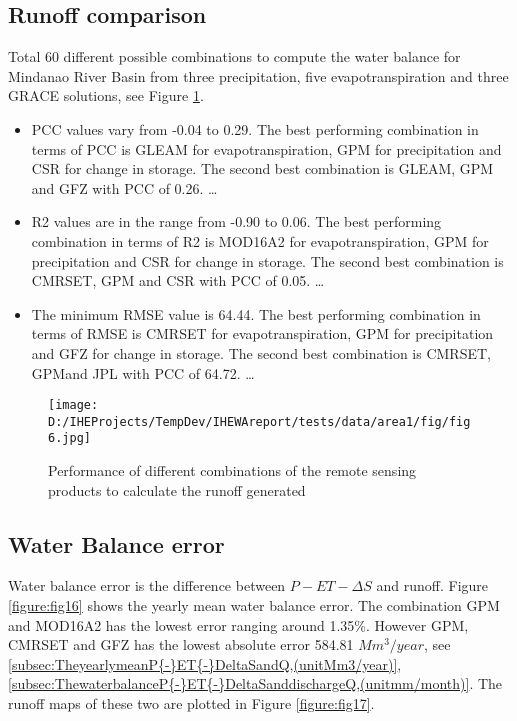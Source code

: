 \documentclass[oneside,openany]{article}%
\begin{document}
\subsection{Runoff comparison}%
\label{subsec:Runoffcomparison}%
Total 60 different possible combinations to compute the water balance for Mindanao River Basin from three precipitation, five evapotranspiration and three GRACE solutions, see Figure \ref{figure:fig15}.%
\linebreak%
\begin{itemize}%
\item%
PCC values vary from {-}0.04 to 0.29. The best performing combination in terms of PCC is GLEAM for evapotranspiration, GPM for precipitation and CSR for change in storage. The second best combination is GLEAM, GPM and GFZ with PCC of 0.26.%
\ldots%
\item%
R2 values are in the range from {-}0.90 to 0.06. The best performing combination in terms of R2 is MOD16A2 for evapotranspiration, GPM for precipitation and CSR for change in storage. The second best combination is CMRSET, GPM and CSR with PCC of 0.05.%
\ldots%
\item%
The minimum RMSE value is 64.44. The best performing combination in terms of RMSE is CMRSET for evapotranspiration, GPM for precipitation and GFZ for change in storage. The second best combination is CMRSET, GPMand JPL with PCC of 64.72.%
\ldots%
\end{itemize}%


\begin{figure}[H]%
\centering%
\texttt{[image: D:/IHEProjects/TempDev/IHEWAreport/tests/data/area1/fig/fig6.jpg]}%
\caption{Performance of different combinations of the remote sensing products to calculate the runoff generated}%
\label{figure:fig15}%
\end{figure}

%
\subsection{Water Balance error}%
\label{subsec:WaterBalanceerror}%
Water balance error is the difference between $P-ET-\Delta S$ and runoff. Figure \ref{figure:fig16} shows the yearly mean water balance error. The combination GPM and MOD16A2 has the lowest error ranging around 1.35\%. However GPM, CMRSET and GFZ has the lowest absolute error 584.81 $Mm^3/year$, see \ref{subsec:TheyearlymeanP{-}ET{-}DeltaSandQ,(unitMm3/year)}, \ref{subsec:ThewaterbalanceP{-}ET{-}DeltaSanddischargeQ,(unitmm/month)}. The runoff maps of these two are plotted in Figure \ref{figure:fig17}.%
\linebreak%
\end{document}
